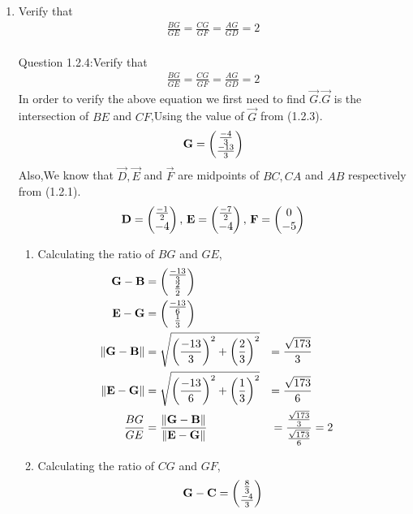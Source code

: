 \documentclass[11pt]{book}
\begin{document}
\begin{enumerate}[label=\thesection.\arabic*.,ref=\thesection.\theenumi]
\item Verify that 
		\begin{align}
			\frac{BG}{GE} = 
			\frac{CG}{GF} =
			\frac{AG}{GD} =2 
		\end{align}\\
Question 1.2.4:Verify that 
\begin{align}
		\frac{BG}{GE} = 
		\frac{CG}{GF} =
		\frac{AG}{GD} = 2 
\end{align}
\solution In order to verify the above equation we first need to find $\vec{G}$.$\vec{G}$ is the intersection of $BE$ and $CF$,Using the value of $\vec{G}$ from (1.2.3).
\begin{align}
		\mathbf{G} = \begin{pmatrix}\frac{-4}{3} \\ \frac{-13}{3}\end{pmatrix}
\end{align}
Also,We know that $\vec{D}, \vec{E}$ and $\vec{F}$ are midpoints of $BC, CA$ and $AB$ respectively from (1.2.1).
\begin{align}
		\mathbf{D} = \begin{pmatrix}\frac{-1}{2} \\ -4\end{pmatrix},\,
		\mathbf{E} = \begin{pmatrix}\frac{-7}{2} \\ -4\end{pmatrix},\,
		\mathbf{F} = \begin{pmatrix}0 \\ -5\end{pmatrix}
\end{align}
\begin{enumerate}
\item Calculating the ratio of $BG$ and $GE$,
\begin{align}
		\label{eq:tri-pts/4} \vec{G}-\vec{B} &= \myvec{\frac{-13}{3} \\ \frac{2}{2}} \\
		\label{eq:tri-pts/5} \vec{E}-\vec{G} &= \myvec{\frac{-13}{6} \\ \frac{1}{3}} \\
		\label{eq:tri-pts/6} \norm{\vec{G}-\vec{B}} &= \sqrt{\brak{\frac{-13}{3}}^2 + \brak{\frac{2}{3}}^{2}} &= \frac{\sqrt{173}}{3} \\
		\label{eq:tri-pts/7} \norm{\vec{E}-\vec{G}} &= \sqrt{\brak{\frac{-13}{6}}^2 + \brak{\frac{1}{3}}^2} &= \frac{\sqrt{173}}{6} \\
		\label{eq:tri-pts/8}\frac{BG}{GE} &= \frac{\norm{\vec{G}-\vec{B}}}{\norm{\vec{E}-\vec{G}}} &= \frac{\frac{\sqrt{173}}{3}}{\frac{\sqrt{173}}{6}} &= 2  
\end{align}		
\item Calculating the ratio of $CG$ and $GF$,
\begin{align}
		\label{eq:tri-pts/9} \vec{G}-\vec{C} &= \myvec{\frac{8}{3} \\ \frac{-4}{3}} \\

\end{align}
\end{enumerate}
\end{enumerate}
\end{document}
